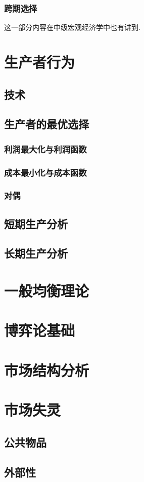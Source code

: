 \documentclass[lang=cn,10pt]{elegantbook}
\begin{document}
\subsection{跨期选择}
这一部分内容在中级宏观经济学中也有讲到.
\newpage

\chapter{生产者行为}
\section{技术}
\section{生产者的最优选择}
\subsection{利润最大化与利润函数}
\subsection{成本最小化与成本函数}
\subsection{对偶}
\section{短期生产分析}
\section{长期生产分析}

\chapter{一般均衡理论}

\chapter{博弈论基础}

\chapter{市场结构分析}

\chapter{市场失灵}
\section{公共物品}
\section{外部性}
\end{document}
